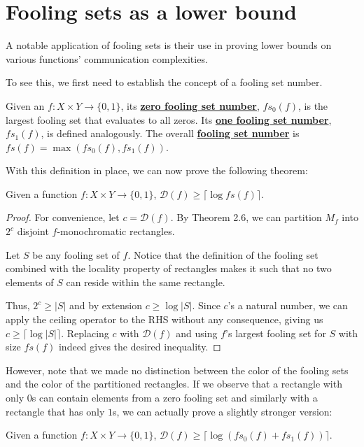 \documentclass[letterpaper]{article}
\begin{document}
\section{Fooling sets as a lower bound}

A notable application of fooling sets is their use in proving
lower bounds on various functions' communication complexities.

To see this, we first need to establish the concept of a fooling set number.

\begin{definition}
    Given an $f: X \times Y \to \{0, 1\}$, its \underline{\textbf{zero fooling set number}}, $fs_0(f)$,
    is the largest fooling set that evaluates to all zeros.
    Its \underline{\textbf{one fooling set number}}, $fs_1(f)$, is defined analogously.
    The overall \underline{\textbf{fooling set number}} is $fs(f)=\max(fs_0(f), fs_1(f))$.
\end{definition}

With this definition in place, we can now prove the following theorem:

\begin{theorem}
    Given a function $f: X \times Y \to \{0, 1\}$, $\mathcal{D}(f) \ge \lceil\log fs(f)\rceil$.
\end{theorem}

\begin{proof}
    For convenience, let $c=\mathcal{D}(f)$.
    By Theorem 2.6, we can partition $M_f$ into $2^c$ disjoint $f$-monochromatic rectangles.

    Let $S$ be any fooling set of $f$.
    Notice that the definition of the fooling set combined with the locality property
    of rectangles makes it such that no two elements of $S$ can reside within the same rectangle.

    Thus, $2^c \ge |S|$ and by extension $c \ge \log |S|$.
    Since $c$'s a natural number, we can apply the ceiling operator to the RHS
    without any consequence, giving us $c \ge \lceil\log |S|\rceil$.
    Replacing $c$ with $\mathcal{D}(f)$ and using $f$'s largest fooling set
    for $S$ with size $fs(f)$ indeed gives the desired inequality.
\end{proof}

However, note that we made no distinction between the color of the fooling sets
and the color of the partitioned rectangles.
If we observe that a rectangle with only $0$s can contain elements from a zero
fooling set and similarly with a rectangle that has only $1$s,
we can actually prove a slightly stronger version:
\begin{theorem}
    Given a function $f: X \times Y \to \{0, 1\}$, $\mathcal{D}(f) \ge \lceil\log (fs_0(f)+fs_1(f))\rceil$.
\end{theorem}
\end{document}
